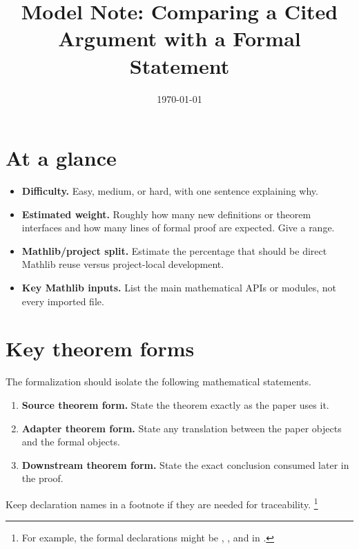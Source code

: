 \documentclass{article}
\title{Model Note: Comparing a Cited Argument with a Formal Statement}
\author{}
\date{\today}
\begin{document}
\maketitle


\section{At a glance}

\begin{itemize}
  \item \textbf{Difficulty.} Easy, medium, or hard, with one sentence explaining why.
  \item \textbf{Estimated weight.} Roughly how many new definitions or theorem
  interfaces and how many lines of formal proof are expected.  Give a range.
  \item \textbf{Mathlib/project split.} Estimate the percentage that should be
  direct Mathlib reuse versus project-local development.
  \item \textbf{Key Mathlib inputs.} List the main mathematical APIs or modules,
  not every imported file.
\end{itemize}

\section{Key theorem forms}

The formalization should isolate the following mathematical statements.
\begin{enumerate}
  \item \textbf{Source theorem form.}  State the theorem exactly as the paper uses it.
  \item \textbf{Adapter theorem form.}  State any translation between the paper
  objects and the formal objects.
  \item \textbf{Downstream theorem form.}  State the exact conclusion consumed
  later in the proof.
\end{enumerate}
Keep declaration names in a footnote if they are needed for traceability.%
\footnote{For example, the formal declarations might be ,
, and  in
.}
\end{document}
